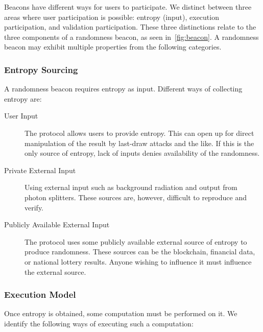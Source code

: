 Beacons have different ways for users to participate. We distinct between three areas where user participation is possible: entropy (input), execution participation, and validation participation. These three distinctions relate to the three components of a randomness beacon, as seen in~\vref{fig:beacon}. A randomness beacon may exhibit multiple properties from the following categories.

\subsubsection{Entropy Sourcing}
A randomness beacon requires entropy as input. Different ways of collecting entropy are: 

\begin{description}
    \item [User Input] The protocol allows users to provide entropy. This can open up for direct manipulation of the result by last-draw attacks and the like. If this is the only source of entropy, lack of inputs denies availability of the randomness.
    \item [Private External Input] Using external input such as background radiation and output from photon splitters. These sources are, however, difficult to reproduce and verify.
    \item [Publicly Available External Input] The protocol uses some publicly available external source of entropy to produce randomness. These sources can be the blockchain, financial data, or national lottery results. Anyone wishing to influence it must influence the external source.
\end{description}

\subsubsection{Execution Model}
Once entropy is obtained, some computation must be performed on it. We identify the following ways of executing such a computation:

